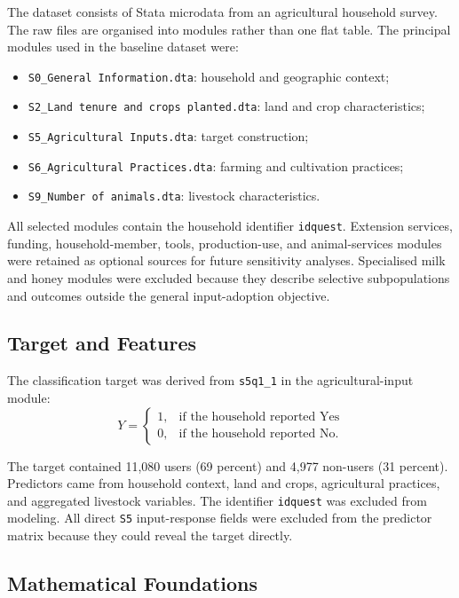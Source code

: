\documentclass[12pt,a4paper]{article}
\begin{document}
The dataset consists of Stata microdata from an agricultural household survey. The raw files are organised into modules rather than one flat table. The principal modules used in the baseline dataset were:

\begin{itemize}[leftmargin=1.5em]
    \item \texttt{S0\_General Information.dta}: household and geographic context;
    \item \texttt{S2\_Land tenure and crops planted.dta}: land and crop characteristics;
    \item \texttt{S5\_Agricultural Inputs.dta}: target construction;
    \item \texttt{S6\_Agricultural Practices.dta}: farming and cultivation practices;
    \item \texttt{S9\_Number of animals.dta}: livestock characteristics.
\end{itemize}

All selected modules contain the household identifier \texttt{idquest}. Extension services, funding, household-member, tools, production-use, and animal-services modules were retained as optional sources for future sensitivity analyses. Specialised milk and honey modules were excluded because they describe selective subpopulations and outcomes outside the general input-adoption objective.

\subsection{Target and Features}

The classification target was derived from \texttt{s5q1\_1} in the agricultural-input module:
\[
Y = \begin{cases}
1, & \text{if the household reported Yes}\\
0, & \text{if the household reported No.}
\end{cases}
\]

The target contained 11,080 users (69 percent) and 4,977 non-users (31 percent). Predictors came from household context, land and crops, agricultural practices, and aggregated livestock variables. The identifier \texttt{idquest} was excluded from modeling. All direct \texttt{S5} input-response fields were excluded from the predictor matrix because they could reveal the target directly.

\subsection{Mathematical Foundations}
\end{document}
